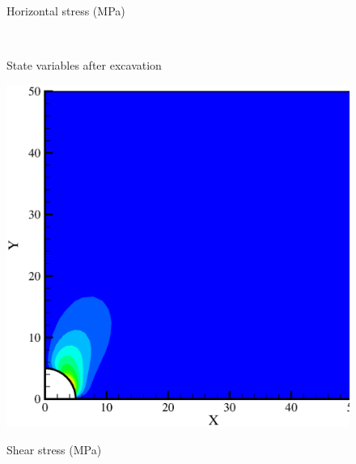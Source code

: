\begin{figure}[!htb]
\begin{center}
\begin{minipage}[t]{0.45\textwidth}
\begin{center}
    \centerline{Horizontal stress (MPa)}
    \end{center}
   \end{minipage}\\
  \end{center}
  \caption{State variables after excavation}
  \label{fig_modelhm}
\end{figure}

\begin{figure}[!htb]
  \begin{center}
   \begin{minipage}[t]{0.45\textwidth}
     \begin{center}
    \includegraphics[scale=0.3]{M/ee_sxy.eps}
    \centerline{Shear stress (MPa)}
    \end{center}
   \end{minipage}
  \hspace{0.02\textwidth}
   \begin{minipage}[t]{0.45\textwidth}
    \begin{center}

\end{center}
\end{minipage}
\end{center}
\end{figure}
